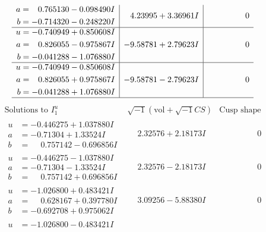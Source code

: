 \documentclass[1p]{elsarticle_modified}
\theoremstyle{definition}
\newcommand{\I}{\sqrt{-1}}
\begin{document}
$$\begin{array}{c|c|c}
\begin{aligned}
a &= \phantom{-}0.765130 - 0.098490 I \\
b &= -0.714320 - 0.248220 I\end{aligned}
 & \phantom{-}4.23995 + 3.36961 I & \phantom{-0.000000 } 0 \\ \hline\begin{aligned}
u &= -0.740949 + 0.850608 I \\
a &= \phantom{-}0.826055 - 0.975867 I \\
b &= -0.041288 - 1.076880 I\end{aligned}
 & -9.58781 + 2.79623 I & \phantom{-0.000000 } 0 \\ \hline\begin{aligned}
u &= -0.740949 - 0.850608 I \\
a &= \phantom{-}0.826055 + 0.975867 I \\
b &= -0.041288 + 1.076880 I\end{aligned}
 & -9.58781 - 2.79623 I & \phantom{-0.000000 } 0\\
 \hline 
 \end{array}$$\newpage$$\begin{array}{c|c|c}  
\text{Solutions to }I^u_{1}& \I (\text{vol} + \sqrt{-1}CS) & \text{Cusp shape}\\
 \hline 
\begin{aligned}
u &= -0.446275 + 1.037880 I \\
a &= -0.71304 + 1.33524 I \\
b &= \phantom{-}0.757142 - 0.696856 I\end{aligned}
 & \phantom{-}2.32576 + 2.18173 I & \phantom{-0.000000 } 0 \\ \hline\begin{aligned}
u &= -0.446275 - 1.037880 I \\
a &= -0.71304 - 1.33524 I \\
b &= \phantom{-}0.757142 + 0.696856 I\end{aligned}
 & \phantom{-}2.32576 - 2.18173 I & \phantom{-0.000000 } 0 \\ \hline\begin{aligned}
u &= -1.026800 + 0.483421 I \\
a &= \phantom{-}0.628167 + 0.397780 I \\
b &= -0.692708 + 0.975062 I\end{aligned}
 & \phantom{-}3.09256 - 5.88380 I & \phantom{-0.000000 } 0 \\ \hline\begin{aligned}
u &= -1.026800 - 0.483421 I \\

\end{aligned}
\end{array}$$
\end{document}
